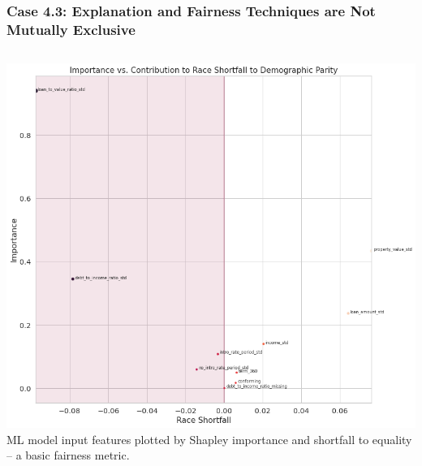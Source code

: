 \documentclass[11pt,aspectratio=169,hyperref={colorlinks}]{beamer}
\begin{document}
	\begin{frame}
	
		\frametitle{\large{\textbf{Case 4.3}: Explanation and Fairness Techniques are \textbf{Not Mutually Exclusive}}}
		
		
				\begin{columns}
			
					\includegraphics[height=.8\linewidth]{../img/fi_shortfall.png}\\
					\vspace{5pt}
					\scriptsize{ML model input features plotted by Shapley importance and shortfall to equality -- a basic fairness metric.}
		

\end{columns}
\end{frame}
\end{document}
